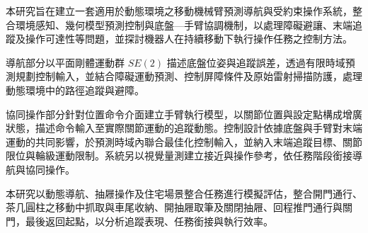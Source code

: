 \begin{abstractzh}
\setcounter{page}{1}

本研究旨在建立一套適用於動態環境之移動機械臂預測導航與受約束操作系統，整合環境感知、幾何模型預測控制與底盤—手臂協調機制，以處理障礙避讓、末端追蹤及操作可達性等問題，並探討機器人在持續移動下執行操作任務之控制方法。

導航部分以平面剛體運動群 \(SE(2)\) 描述底盤位姿與追蹤誤差，透過有限時域預測規劃控制輸入，並結合障礙運動預測、控制屏障條件及原始雷射掃描防護，處理動態環境中的路徑追蹤與避障。

協同操作部分針對位置命令介面建立手臂執行模型，以關節位置與設定點構成增廣狀態，描述命令輸入至實際關節運動的追蹤動態。控制設計依據底盤與手臂對末端運動的共同影響，於預測時域內聯合最佳化控制輸入，並納入末端追蹤目標、關節限位與輪級運動限制。系統另以視覺量測建立接近與操作參考，依任務階段銜接導航與協同操作。

本研究以動態導航、抽屜操作及住宅場景整合任務進行模擬評估，整合開門通行、茶几圓柱之移動中抓取與車尾收納、開抽屜取筆及關閉抽屜、回程推門通行與關門，最後返回起點，以分析追蹤表現、任務銜接與執行效率。

\end{abstractzh}
